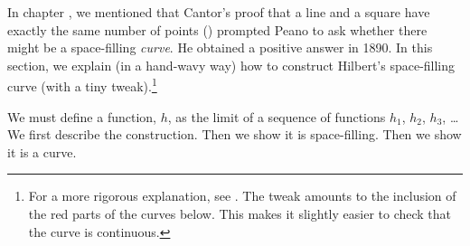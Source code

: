 \documentclass[../../../include/open-logic-section]{subfiles}
\begin{document}


In chapter , we mentioned that Cantor's proof that
a line and a square have exactly the same number of points
() prompted Peano to
ask whether there might be a space-filling \emph{curve}. He obtained a
positive answer in 1890. In this section, we explain (in a
hand-wavy way) how to construct Hilbert's space-filling curve (with a
tiny tweak).\footnote{For a more rigorous explanation, see
\cite{Rose2010}. The tweak amounts to the inclusion of the red
parts of the curves below. This makes it slightly easier to check that
the curve is continuous.}

We must define a function, $h$, as the limit of a sequence of functions $h_1$, $h_2$, $h_3$, \dots\@ We first describe the construction. Then we show it is space-filling. Then we show it is a curve. 
\end{document}

